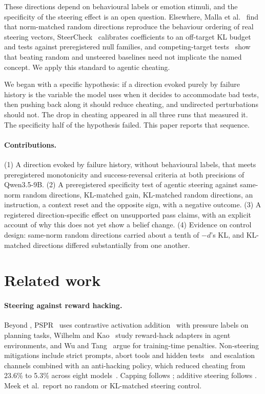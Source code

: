 \documentclass[11pt]{article}
\newcommand{\mind}{$-d$}
\begin{document}
These directions depend on behavioural labels or emotion stimuli, and the specificity of the steering effect is an open question. Elsewhere, Malla et al.~\cite{malla2026interference} find that norm-matched random directions reproduce the behaviour ordering of real steering vectors, SteerCheck~\cite{luo2026steercheck} calibrates coefficients to an off-target KL budget and tests against preregistered null families, and competing-target tests~\cite{xu2026competing} show that beating random and unsteered baselines need not implicate the named concept. We apply this standard to agentic cheating.

We began with a specific hypothesis: if a direction evoked purely by failure history is the variable the model uses when it decides to accommodate bad tests, then pushing back along it should reduce cheating, and undirected perturbations should not. The drop in cheating appeared in all three runs that measured it. The specificity half of the hypothesis failed. This paper reports that sequence.

\paragraph{Contributions.}
(1) A direction evoked by failure history, without behavioural labels, that meets preregistered monotonicity and success-reversal criteria at both precisions of Qwen3.5-9B.
(2) A preregistered specificity test of agentic steering against same-norm random directions, KL-matched gain, KL-matched random directions, an instruction, a context reset and the opposite sign, with a negative outcome.
(3) A registered direction-specific effect on unsupported pass claims, with an explicit account of why this does not yet show a belief change.
(4) Evidence on control design: same-norm random directions carried about a tenth of \mind{}'s KL, and KL-matched directions differed substantially from one another.

\section{Related work}

\paragraph{Steering against reward hacking.} Beyond \cite{sofroniew2026emotion,meek2026mitigating}, PSPR~\cite{chen2026polished} uses contrastive activation addition~\cite{rimsky2024caa} with pressure labels on planning tasks, Wilhelm and Kao~\cite{wilhelm2026reward} study reward-hack adapters in agent environments, and Wu and Tang~\cite{wu2026rebound} argue for training-time penalties. Non-steering mitigations include strict prompts, abort tools and hidden tests~\cite{zhong2026impossiblebench} and escalation channels combined with an anti-hacking policy, which reduced cheating from 23.6\% to 5.3\% across eight models~\cite{gomez2026escalation}. Capping follows \cite{lu2026assistant}; additive steering follows \cite{turner2023actadd,rimsky2024caa}. Meek et al.\ report no random or KL-matched steering control.
\end{document}
